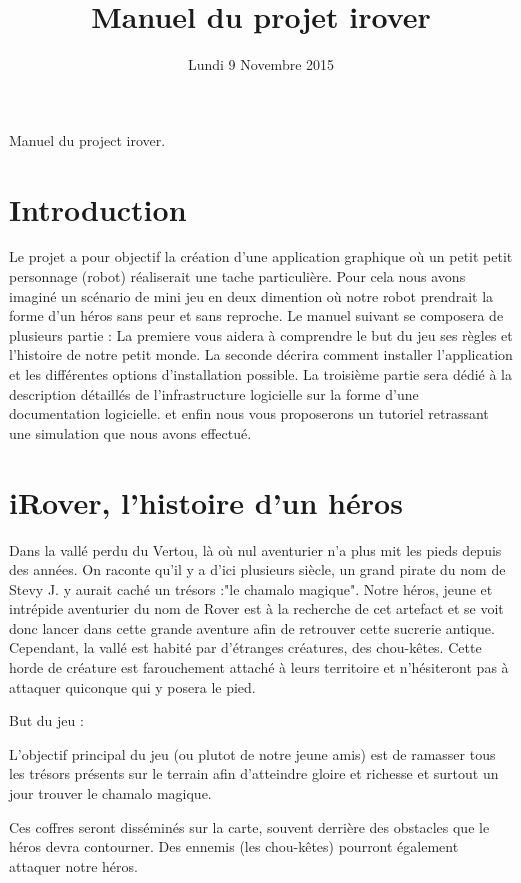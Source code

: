 \documentclass[a4paper 12pts]{article}
\title{Manuel du projet irover}
\date{Lundi 9 Novembre 2015}
\author{}
\begin{document}
\maketitle

Manuel du project irover.


\newpage

\section{Introduction}



Le projet a pour objectif la création d'une application graphique où un petit petit personnage (robot) réaliserait une tache particulière.
Pour cela nous avons imaginé un scénario de mini jeu en deux dimention où notre robot prendrait la forme d'un héros sans peur et sans reproche.
Le manuel suivant se composera de plusieurs partie :
La premiere vous aidera à comprendre le but du jeu ses règles et l'histoire de notre petit monde.
La seconde décrira comment installer l'application et les différentes options d'installation possible. 
La troisième partie sera dédié à la description détaillés de l'infrastructure logicielle sur la forme d'une documentation logicielle. 
et enfin nous vous proposerons un tutoriel retrassant une simulation que nous avons effectué.


\section{iRover, l'histoire d'un héros}


Dans la vallé perdu du Vertou, là où nul aventurier n'a plus mit les pieds depuis des années. On raconte qu'il y a d'ici
plusieurs siècle, un grand pirate du nom de Stevy J. y aurait caché un trésors :"le chamalo magique".
Notre héros, jeune et intrépide aventurier du nom de Rover est à la recherche de cet artefact et se voit donc lancer 
dans cette grande aventure afin de retrouver cette sucrerie antique.
Cependant, la vallé est habité par d'étranges créatures, des chou-kêtes. Cette horde de créature est farouchement attaché à leurs territoire
et n'hésiteront pas à attaquer quiconque qui y posera le pied.

But du jeu :

L'objectif  principal du jeu (ou plutot de notre jeune amis) est de ramasser tous les trésors présents 
sur le terrain afin d'atteindre gloire et richesse et surtout un jour trouver le chamalo magique.

Ces coffres seront disséminés sur la carte, souvent derrière des obstacles que le héros devra contourner. 
Des ennemis (les chou-kêtes) pourront également attaquer notre héros.
\end{document}
